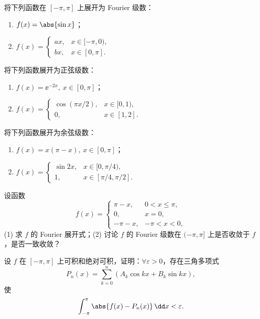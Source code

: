 \begin{xexercise}[4]
将下列函数在 $[-\pi,\pi]$ 上展开为 Fourier 级数：
  \begin{enumerate}[label=(\arabic*)]
    \item $f(x)=\abs{\sin x}$；
    \item $f(x)=\begin{cases}ax,&x\in[-\pi,0),\\ bx,&x\in[0,\pi].\end{cases}$
  \end{enumerate}
\end{xexercise}

\begin{xexercise}[5]
将下列函数展开为正弦级数：
  \begin{enumerate}[label=(\arabic*)]
    \item $f(x)=\ee^{-2x},\ x\in[0,\pi]$；
    \item $f(x)=\begin{cases}\cos(\pi x/2),&x\in[0,1),\\0,&x\in[1,2].\end{cases}$
  \end{enumerate}
\end{xexercise}

\begin{xexercise}[6]
将下列函数展开为余弦级数：
  \begin{enumerate}[label=(\arabic*)]
    \item $f(x)=x(\pi-x),\ x\in[0,\pi]$；
    \item $f(x)=\begin{cases}\sin2x,&x\in[0,\pi/4),\\1,&x\in[\pi/4,\pi/2].\end{cases}$
  \end{enumerate}
\end{xexercise}

\begin{xexercise}[7]
设函数
  \[
    f(x)=\begin{cases}
      \pi-x,&0<x\le\pi,\\
      0,&x=0,\\
      -\pi-x,&-\pi<x<0,
    \end{cases}
  \]
  (1) 求 $f$ 的 Fourier 展开式；(2) 讨论 $f$ 的 Fourier 级数在 $(-\pi,\pi]$ 上是否收敛于 $f$，是否一致收敛？
\end{xexercise}

\begin{xexercise}[8]
设 $f$ 在 $[-\pi,\pi]$ 上可积和绝对可积，证明：$\forall\varepsilon>0$，存在三角多项式
  \[
    P_n(x)=\sum_{k=0}^{n}(A_k\cos kx+B_k\sin kx),
  \]
  使
  \[
    \int_{-\pi}^{\pi}\abs{f(x)-P_n(x)}\,\dd x<\varepsilon.
  \]
\end{xexercise}

